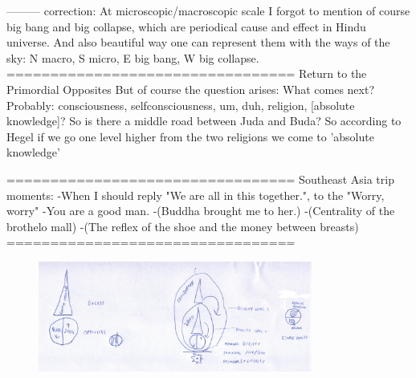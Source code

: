 \documentclass[10pt]{book}
\begin{document}
---------
correction:
At microscopic/macroscopic scale I forgot to mention of course big bang and big collapse, which are periodical cause and effect in Hindu universe. And also beautiful way one can represent them with the ways of the sky: N macro, S micro, E big bang, W big collapse.
=================================
Return to the Primordial Opposites
But of course the question arises: What comes next? Probably: consciousness, selfconsciousness, um, duh, religion, [absolute knowledge]?
So is there a middle road between Juda and Buda?
So according to Hegel if we go one level higher from the two religions we come to 'absolute knowledge'

=================================
Southeast Asia trip moments:
-When I should reply "We are all in this together.", to the "Worry, worry"
-You are a good man.
-(Buddha brought me to her.)
-(Centrality of the brothelo mall)
-(The reflex of the shoe and the money between breasts)
=================================

\begin{figure}[ht!]
\centering
\includegraphics[width=90mm]{scan00.jpg}
\label{overflow}
\end{figure}
\end{document}
